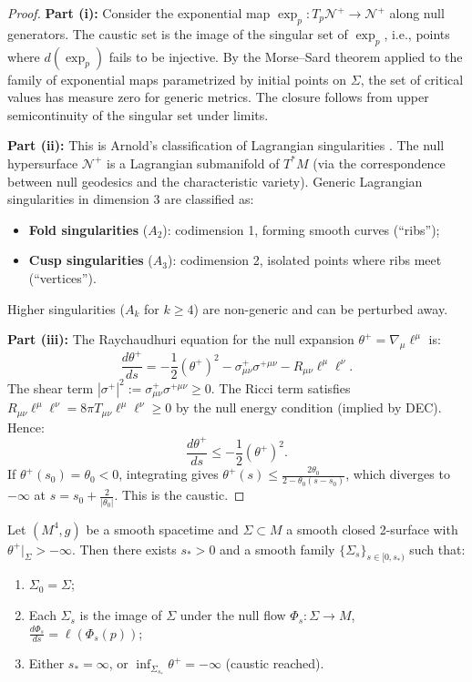 \begin{proof}
\textbf{Part (i):} Consider the exponential map $\exp_p: T_p\mathcal{N}^+ \to \mathcal{N}^+$ along null generators. The caustic set is the image of the singular set of $\exp_p$, i.e., points where $d(\exp_p)$ fails to be injective. By the Morse--Sard theorem applied to the family of exponential maps parametrized by initial points on $\Sigma$, the set of critical values has measure zero for generic metrics. The closure follows from upper semicontinuity of the singular set under limits.

\textbf{Part (ii):} This is Arnold's classification of Lagrangian singularities \cite{arnold1990singularities}. The null hypersurface $\mathcal{N}^+$ is a Lagrangian submanifold of $T^*M$ (via the correspondence between null geodesics and the characteristic variety). Generic Lagrangian singularities in dimension 3 are classified as:
\begin{itemize}
\item \textbf{Fold singularities} ($A_2$): codimension 1, forming smooth curves (``ribs'');
\item \textbf{Cusp singularities} ($A_3$): codimension 2, isolated points where ribs meet (``vertices'').
\end{itemize}
Higher singularities ($A_k$ for $k \geq 4$) are non-generic and can be perturbed away.

\textbf{Part (iii):} The Raychaudhuri equation for the null expansion $\theta^+ = \nabla_\mu \ell^\mu$ is:
\begin{equation}
\frac{d\theta^+}{ds} = -\frac{1}{2}(\theta^+)^2 - \sigma^+_{\mu\nu}\sigma^{+\mu\nu} - R_{\mu\nu}\ell^\mu\ell^\nu.
\end{equation}
The shear term $|\sigma^+|^2 := \sigma^+_{\mu\nu}\sigma^{+\mu\nu} \geq 0$. The Ricci term satisfies $R_{\mu\nu}\ell^\mu\ell^\nu = 8\pi T_{\mu\nu}\ell^\mu\ell^\nu \geq 0$ by the null energy condition (implied by DEC). Hence:
\begin{equation}
\frac{d\theta^+}{ds} \leq -\frac{1}{2}(\theta^+)^2.
\end{equation}
If $\theta^+(s_0) = \theta_0 < 0$, integrating gives $\theta^+(s) \leq \frac{2\theta_0}{2 - \theta_0(s - s_0)}$, which diverges to $-\infty$ at $s = s_0 + \frac{2}{|\theta_0|}$. This is the caustic.
\end{proof}

\begin{theorem}
\label{thm:local-null-flow}
Let $(M^4, g)$ be a smooth spacetime and $\Sigma \subset M$ a smooth closed 2-surface with $\theta^+|_\Sigma > -\infty$. Then there exists $s_* > 0$ and a smooth family $\{\Sigma_s\}_{s \in [0, s_*)}$ such that:
\begin{enumerate}[label=(\roman*)]
\item $\Sigma_0 = \Sigma$;
\item Each $\Sigma_s$ is the image of $\Sigma$ under the null flow $\Phi_s: \Sigma \to M$, $\frac{d\Phi_s}{ds} = \ell(\Phi_s(p))$;
\item Either $s_* = \infty$, or $\inf_{\Sigma_{s_*}} \theta^+ = -\infty$ (caustic reached).
\end{enumerate}
\end{theorem}

